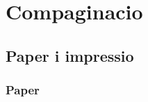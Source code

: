 \chapter{Compaginacio}\label{C:empty}

\section{Paper i impressio}

\cite{primes}

\subsection{Paper}
